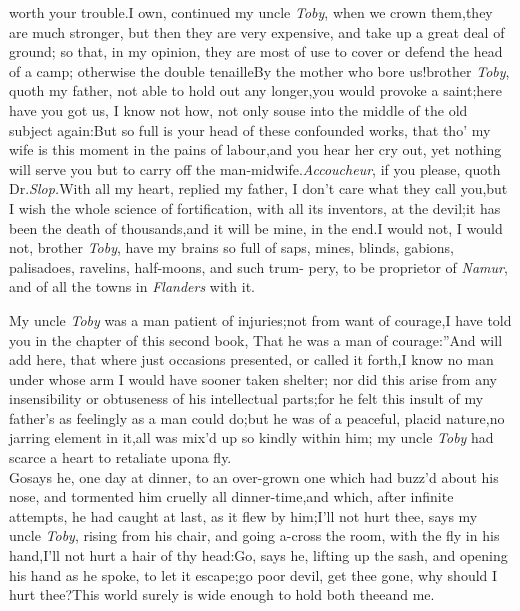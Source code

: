 \documentclass{article}
\begin{document}
worth your trouble.\tsh I own, continued my uncle \textit{Toby},
when we crown them,\tsk they are much stronger, but
then they are very expensive, and take up a great deal of
ground; so that,\break
in my opinion, they are most of use to\break
cover or defend the head of a camp;\break
otherwise the double tenaille\tsh By\break
the mother who bore us!\tsh brother
\textit{Toby}, quoth my father, not able to hold out any
longer,\tsk you would provoke a saint;\tsk here have you
got us, I know not how, not only souse into the middle of
the old subject again:\tsk But so full is your head of these
confounded works, that tho’ my wife is this moment in the
pains of labour,\tsk and you hear her cry out,\tsk\break
yet nothing will serve you but to carry\break
off the man-midwife.\tsh \textit{Accoucheur},\tsk\break
if you please, quoth Dr.\@ \textit{Slop.}\tsk With all 
my heart, replied my father, I don’t care
what they call you,\tsk but I wish the whole
science of fortification, with all its inventors, at the
devil;\tsk it has been the death of thousands,\tsk and it
will be mine, in the end.\tsk I would not, I would not,
brother \textit{Toby}, have my brains so full of saps,
mines, blinds, gabions, palisadoes, ravelins, half-moons,
and such trum-
pery, to be proprietor of \textit{Namur}, and of\break
all the towns in \textit{Flanders} with it.

My uncle \textit{Toby} was a man patient of injuries;\tsk not
from want of courage,\tsk I have told you in the chapter of
this\break
second book, \lqq That he was a man of\break
\lqq courage:”\tsk And will add here, that where just
occasions presented, or called it forth,\tsk I know no man
under whose arm I would have sooner taken shelter;\break
nor did this arise from any insensibility or obtuseness of
his intellectual parts;\tsk\break for he felt this insult of my
father’s as feelingly as a man could do;\tsk but he was of a
peaceful, placid nature,\tsk no\break
jarring element in it,\tsk all was mix’d up\break
so kindly within him; my uncle \textit{Toby}\break
had scarce a heart to retaliate upon\break a fly.\\
\newpage
\tsk Go\tsk says he, one day at dinner, to an over-grown one
which had buzz’d about his nose, and tormented him cruelly all
dinner-time,\tsk and which, after infinite attempts, he had caught
at last, as it flew by him;\tsk I’ll not hurt thee,
says my uncle \textit{Toby}, rising from his chair, and
going a-cross
the room, with the fly in his hand,\tsk I’ll not hurt a
hair of thy head:\tsk Go, says he, lifting up the sash, and
opening his hand as he spoke, to let it escape;\tsk go poor
devil, get thee gone, why should I hurt thee?\tsh This
world surely is wide enough to hold both thee\break and me.
\end{document}
